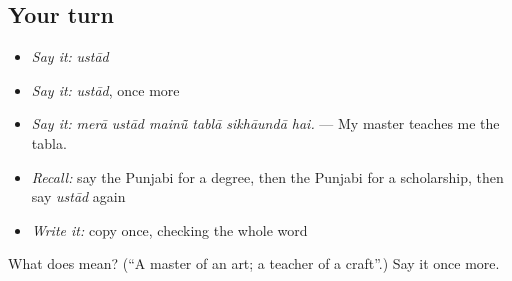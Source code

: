 \subsection*{Your turn}
\begin{itemize}
\raggedright
  \item \emph{Say it:} \emph{ustād}
  \item \emph{Say it:} \emph{ustād}, once more
  \item \emph{Say it:} \emph{merā ustād mainū̃ tablā sikhāundā hai.} — My master teaches me the tabla.
  \item \emph{Recall:} say the Punjabi for a degree, then the Punjabi for a scholarship, then say \emph{ustād} again
  \item \emph{Write it:} copy \textbf{} once, checking the whole word
\end{itemize}

\begin{tcolorbox}[breakable,colback=teal!4,colframe=teal!35!black,title={Before you move on}]
What does  mean? (\textquotedblleft{}A master of an art; a teacher of a craft\textquotedblright{}.) Say it once more.
\end{tcolorbox}
